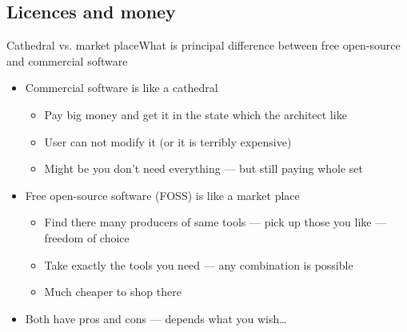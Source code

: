 \documentclass[hyperref={bookmarks=true, unicode=true, colorlinks=true, pdftitle={Linux, command line and MetaCentrum}, plainpages=false, pdfauthor={Vojtech Zeisek}, pdfsubject={Course about use of Linux command line, writing shell scripts and using MetaCentrum of CESNET}, pdfcreator={XeLaTeX, http://www.xelatex.org/}, pdfkeywords={Linux, GNU, BASH, shell, command line, MetaCentrum}, linkcolor=Sienna, anchorcolor=black, citecolor=green, filecolor=magenta, menucolor=Sienna, urlcolor=cyan, pdftex}, compress, ucs, xelatex, xcolor=svgnames, 11pt]{beamer}
\begin{document}
\subsection{Licences and money}

\begin{frame}{Cathedral vs. market place}{What is principal difference between free open-source and commercial software}
\begin{itemize}
  \item Commercial software is like a cathedral
  \begin{itemize}
    \item Pay big money and get it in the state which the architect like
    \item User can not modify it (or it is terribly expensive)
    \item Might be you don't need everything --- but still paying whole set
  \end{itemize}
  \item Free open-source software (FOSS) is like a market place
  \begin{itemize}
    \item Find there many producers of same tools --- pick up those you like --- freedom of choice
    \item Take exactly the tools you need --- any combination is possible
    \item Much cheaper to shop there
  \end{itemize}
  \item Both have pros and cons --- depends what you wish\ldots
\end{itemize}
\end{frame}
\end{document}
